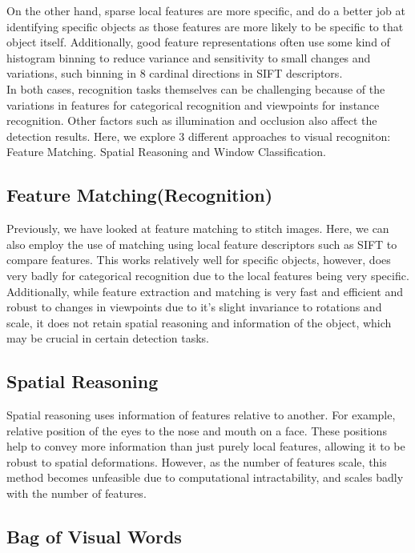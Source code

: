 \documentclass[12pt]{article}
\begin{document}
On the other hand, sparse local features are more specific, and do a better job at identifying specific objects as those features are more likely to be specific to that object itself. Additionally, good feature representations often use some kind of histogram binning to reduce variance and sensitivity to small changes and variations, such binning in 8 cardinal directions in SIFT descriptors.\\

In both cases, recognition tasks themselves can be challenging because of the variations in features for categorical recognition and viewpoints for instance recognition. Other factors such as illumination and occlusion also affect the detection results. Here, we explore 3 different approaches to visual recogniton: Feature Matching. Spatial Reasoning and Window Classification.

\subsection{Feature Matching(Recognition)}

Previously, we have looked at feature matching to stitch images. Here, we can also employ the use of matching using local feature descriptors such as SIFT to compare features. This works relatively well for specific objects, however, does very badly for categorical recognition due to the local features being very specific. \\

Additionally, while feature extraction and matching is very fast and efficient and robust to changes in viewpoints due to it's slight invariance to rotations and scale, it does not retain spatial reasoning and information of the object, which may be crucial in certain detection tasks.

\subsection{Spatial Reasoning}

Spatial reasoning uses information of features relative to another. For example, relative position of the eyes to the nose and mouth on a face. These positions help to convey more information than just purely local features, allowing it to be robust to spatial deformations. However, as the number of features scale, this method becomes unfeasible due to computational intractability, and scales badly with the number of features.

\subsection{Bag of Visual Words}
\end{document}
